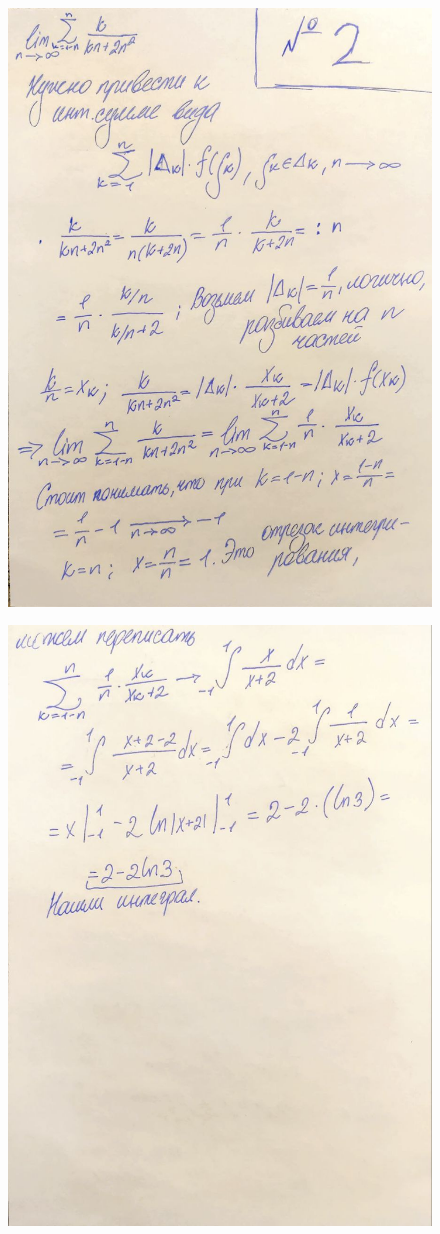 \documentclass[a4paper,12pt]{article}
\begin{document}
\begin{figure}[H]
    \centering
    \includegraphics[width=0.8\linewidth]{img/2_1.jpg}
    \caption{}
    \label{fig:part1}
\end{figure}

\begin{figure}[H]
    \centering
    \includegraphics[width=0.8\linewidth]{img/2_2.jpg}
    \caption{}
    \label{fig:part2}
\end{figure}
\end{document}
